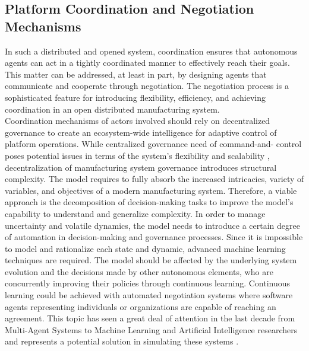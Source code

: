 \subsection{Platform Coordination and Negotiation Mechanisms}
In such a distributed and opened system, coordination ensures that autonomous agents can act in a tightly coordinated manner to effectively reach their goals. This matter can be addressed, at least in part, by designing agents that communicate and cooperate through negotiation. The negotiation process is a sophisticated feature for introducing flexibility, efficiency, and achieving coordination in an open distributed manufacturing system.\\
Coordination mechanisms of actors involved should rely on decentralized governance to create an ecosystem-wide intelligence for adaptive control of platform operations. While centralized governance need of command-and- control poses potential issues in terms of the system’s flexibility and scalability \parencite{putnik_scalability_2013}, decentralization of manufacturing system governance introduces structural complexity. The model requires to fully absorb the increased intricacies, variety of variables, and objectives of a modern manufacturing system. Therefore, a viable approach is the decomposition of decision-making tasks to improve the model's capability to understand and generalize complexity. In order to manage uncertainty and volatile dynamics, the model needs to introduce a certain degree of automation in decision-making and governance processes. Since it is impossible to model and rationalize each state and dynamic, advanced machine learning techniques are required. The model should be affected by the underlying system evolution and the decisions made by other autonomous elements, who are concurrently improving their policies through continuous learning. Continuous learning could be achieved with automated negotiation systems where software agents representing individuals or organizations are capable of reaching an agreement. This topic has seen a great deal of attention in the last decade from Multi-Agent Systems to Machine Learning and Artificial Intelligence researchers and represents a potential solution in simulating these systems \parencite{lopes_negotiation_2009}.\\
